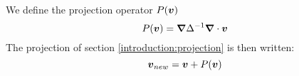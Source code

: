 \begin{definition}
\label{introduction:projectiondef}
We define the projection operator $P({\boldsymbol {v}})$
  \begin{equation}
    P({\boldsymbol {v}})={\boldsymbol {\nabla}}\Delta^{-1}{\boldsymbol {\nabla}}\cdot {\boldsymbol {v}}
  \end{equation}
  The projection of section \ref{introduction:projection} is then written:
  \begin{equation}
    {\boldsymbol {v}}_{new}={\boldsymbol {v}}+P({\boldsymbol {v}})
  \end{equation}

\end{definition}


